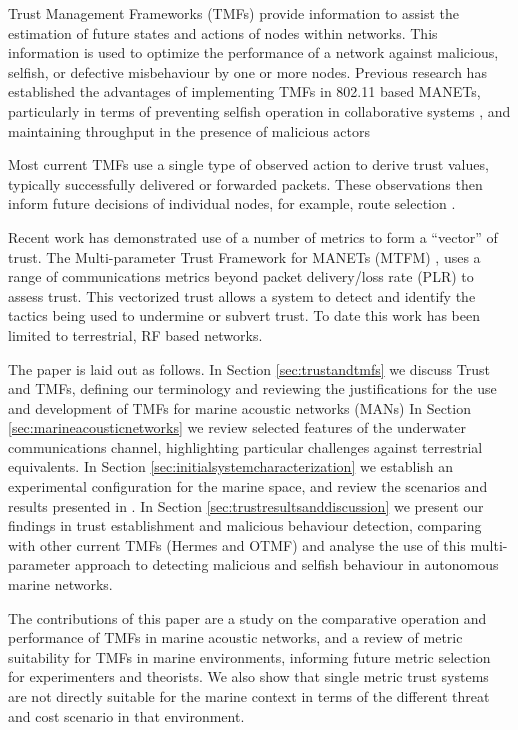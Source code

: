\documentclass[conference]{IEEEtran}
\begin{document}
Trust Management Frameworks (TMFs) provide information to assist the estimation of future states and actions of nodes within networks.
This information is used to optimize the performance of a network against malicious, selfish, or defective misbehaviour by one or more nodes.
Previous research has established the advantages of implementing TMFs in 802.11 based MANETs, particularly in terms of preventing selfish operation in collaborative systems \cite{Li2007}, and maintaining throughput in the presence of malicious actors \cite{Buchegger2002}

Most current TMFs use a single type of observed action to derive trust values, typically successfully delivered or forwarded packets. 
These observations then inform future decisions of individual nodes, for example, route selection \cite{Li2008}.

Recent work has demonstrated use of a number of metrics to form a ``vector'' of trust.
The Multi-parameter Trust Framework for MANETs (MTFM) \cite{Guo11}, uses a range of communications metrics beyond packet delivery/loss rate (PLR) to assess trust.
This vectorized trust allows a system to detect and identify the tactics being used to undermine or subvert trust.
To date this work has been limited to terrestrial, RF based networks. 

The paper is laid out as follows.
In Section \ref{sec:trustandtmfs} we discuss Trust and TMFs, defining our terminology and reviewing the justifications for the use and development of TMFs for marine acoustic networks (MANs)
In Section \ref{sec:marineacousticnetworks} we review selected features of the underwater communications channel, highlighting particular challenges against terrestrial equivalents.
In Section \ref{sec:initialsystemcharacterization} we establish an experimental configuration for the marine space, and review the scenarios and results presented in \cite{Guo11}.
In Section \ref{sec:trustresultsanddiscussion} we present our findings in trust establishment and malicious behaviour detection, comparing with other current TMFs (Hermes and OTMF) and analyse the use of this multi-parameter approach to detecting malicious and selfish behaviour in autonomous marine networks.

The contributions of this paper are a study on the comparative operation and performance of TMFs in marine acoustic networks, and a review of metric suitability for TMFs in marine environments, informing future metric selection for experimenters and theorists.
We also show that single metric trust systems are not directly suitable for the marine context in terms of the different threat and cost scenario in that environment.
\end{document}
